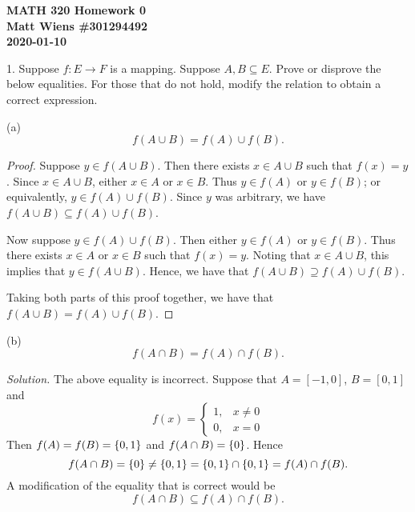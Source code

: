 \documentclass{article}
\begin{document}
\textbf{MATH 320 Homework 0} \\
\textbf{Matt Wiens \#301294492} \\
\textbf{2020-01-10}

1. Suppose $f: E \to F$ is a mapping. Suppose $A, B \subseteq E$. Prove
   or disprove the below equalities. For those that do not hold,
   modify the relation to obtain a correct expression.

(a)
%
\begin{equation*}
    f(A \cup B) = f(A) \cup f(B)
    .
\end{equation*}

\begin{proof}

Suppose $y \in f(A \cup B)$. Then there exists $x \in A \cup B$ such
that $f(x) = y$. Since $x \in A \cup B$, either $x \in A$ or $x \in B$.
Thus $y \in f(A)$ or $y \in f(B)$; or equivalently, $y \in f(A) \cup
f(B)$. Since $y$ was arbitrary, we have $f(A \cup B) \subseteq f(A) \cup
f(B)$.

Now suppose $y \in f(A) \cup f(B)$. Then either $y \in f(A)$ or $y \in
f(B)$. Thus there exists $x \in A$ or $x \in B$ such that $f(x) = y$.
Noting that $x \in A \cup B$, this implies that $y \in f(A \cup B)$.
Hence, we have that $f(A \cup B) \supseteq f(A) \cup f(B)$.

Taking both parts of this proof together, we have that $f(A \cup B) =
f(A) \cup f(B)$.

\end{proof}

(b)
%
\begin{equation*}
    f(A \cap B) = f(A) \cap f(B)
    .
\end{equation*}

\textit{Solution.} The above equality is incorrect. Suppose that $A =
[-1, 0]$, $B = [0, 1]$ and
%
\begin{equation*}
    f(x) =
    \begin{cases}
        1, &x \neq 0 \\
        0, &x = 0
    \end{cases}
\end{equation*}
%
Then $f(A) = f(B) = \cbr{0, 1}$ and $f(A \cap B) = \cbr{0}$. Hence
%
\begin{equation*}
    f(A \cap B)
        = \cbr{0}
        \neq \cbr{0, 1}
        = \cbr{0, 1} \cap \cbr{0, 1}
        = f(A) \cap f(B)
    .
\end{equation*}
%
A modification of the equality that is correct would be
%
\begin{equation*}
    f(A \cap B) \subseteq f(A) \cap f(B)
    .
\end{equation*}
\end{document}
